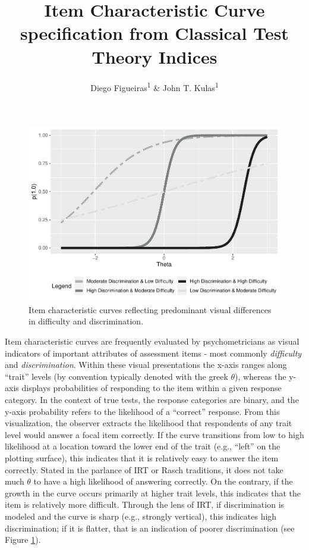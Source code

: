 \documentclass[
  man]{apa6}
\title{Item Characteristic Curve specification from Classical Test Theory Indices}
\author{Diego Figueiras\textsuperscript{1} \& John T. Kulas\textsuperscript{1}}
\date{}
\affiliation{\vspace{0.5cm}\textsuperscript{1} Montclair State University}
\begin{document}
\maketitle

\begin{figure}
\includegraphics[width=1\linewidth,height=0.8\textheight]{ICC_project_files/figure-latex/example-1} \caption{Item characteristic curves reflecting predominant visual differences in difficulty and discrimination.}\label{fig:example}
\end{figure}

Item characteristic curves are frequently evaluated by psychometricians as visual indicators of important attributes of assessment items - most commonly \emph{difficulty} and \emph{discrimination}. Within these visual presentations the x-axis ranges along ``trait'' levels (by convention typically denoted with the greek \(\theta\)), whereas the y-axis displays probabilities of responding to the item within a given response category. In the context of true tests, the response categories are binary, and the y-axis probability refers to the likelihood of a ``correct'' response. From this visualization, the observer extracts the likelihood that respondents of any trait level would answer a focal item correctly. If the curve transitions from low to high likelihood at a location toward the lower end of the trait (e.g., ``left'' on the plotting surface), this indicates that it is relatively easy to answer the item correctly. Stated in the parlance of IRT or Rasch traditions, it does not take much \(\theta\) to have a high likelihood of answering correctly. On the contrary, if the growth in the curve occurs primarily at higher trait levels, this indicates that the item is relatively more difficult. Through the lens of IRT, if discrimination is modeled and the curve is sharp (e.g., strongly vertical), this indicates high discrimination; if it is flatter, that is an indication of poorer discrimination (see Figure \ref{fig:example}).
\end{document}
